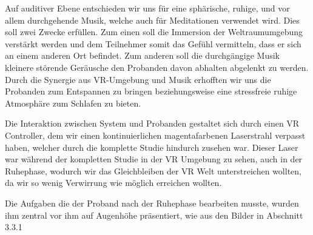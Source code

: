 Auf auditiver Ebene entschieden wir uns für eine sphärische, ruhige, und vor allem durchgehende Musik, welche auch für Meditationen verwendet wird. Dies soll zwei Zwecke erfüllen. Zum einen soll die Immersion der Weltraumumgebung verstärkt werden und dem Teilnehmer somit das Gefühl vermitteln, dass er sich an einem anderen Ort befindet. Zum anderen soll die durchgängige Musik kleinere störende Geräusche den Probanden davon abhalten abgelenkt zu werden.
Durch die Synergie aus VR-Umgebung und Musik erhofften wir uns die Probanden zum Entspannen zu bringen beziehungsweise eine stressfreie ruhige Atmosphäre zum Schlafen zu bieten.

Die Interaktion zwischen System und Probanden gestaltet sich durch einen VR Controller, dem wir einen kontinuierlichen magentafarbenen Laserstrahl verpasst haben, welcher durch die komplette Studie hindurch zusehen war. Dieser Laser war während der kompletten Studie in der VR Umgebung zu sehen, auch in der Ruhephase, wodurch wir das Gleichbleiben der VR Welt unterstreichen wollten, da wir so wenig Verwirrung wie möglich erreichen wollten.

Die Aufgaben die der Proband nach der Ruhephase bearbeiten musste, wurden ihm zentral vor ihm auf Augenhöhe präsentiert, wie aus den Bilder in Abschnitt 3.3.1